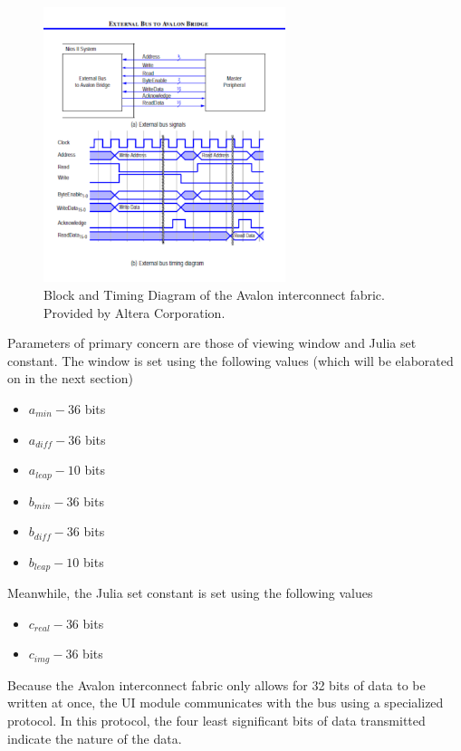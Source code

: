 \documentclass{article}
\begin{document}
\begin{figure}[H]
  \centering
    \includegraphics[width=200pt]{block_diagrams/nbat.pdf}
  \caption{Block and Timing Diagram of the Avalon interconnect
    fabric. Provided by Altera Corporation.}
\end{figure}

Parameters of primary concern are those of viewing window and Julia
set constant. The window is set using the following values (which will
be elaborated on in the next section)

\begin{itemize}
\item $a_{min} - 36$ bits
\item $a_{diff} - 36$ bits
\item $a_{leap} - 10$ bits
\item $b_{min} - 36$ bits
\item $b_{diff} - 36$ bits
\item $b_{leap} - 10$ bits
\end{itemize}

Meanwhile, the Julia set constant is set using the following values

\begin{itemize}
\item $c_{real} - 36$ bits
\item $c_{img} - 36$ bits
\end{itemize}

Because the Avalon interconnect fabric only allows for 32 bits of data
to be written at once, the UI module communicates with the bus using a
specialized protocol. In this protocol, the four least significant
bits of data transmitted indicate the nature of the data.
\end{document}
